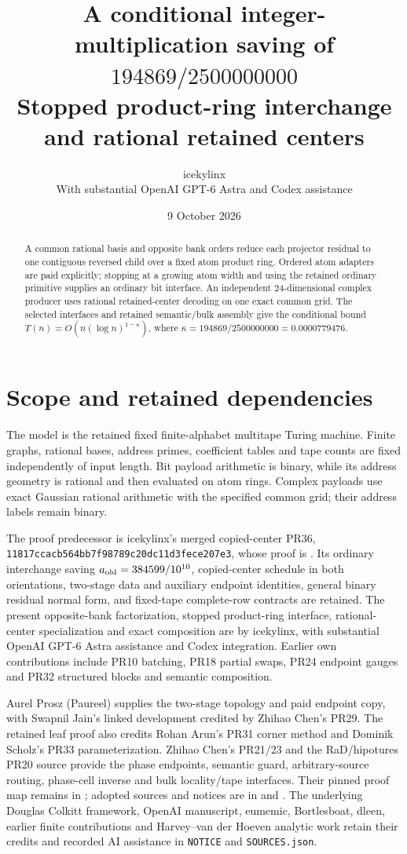 \documentclass[11pt]{article}
\title{A conditional integer-multiplication saving of $194869/2500000000$\\
\large Stopped product-ring interchange and rational retained centers}
\author{icekylinx\\\small With substantial OpenAI GPT-6 Astra and Codex assistance}
\date{9 October 2026}
\begin{document}
\maketitle
\begin{abstract}
A common rational basis and opposite bank orders reduce each projector
residual to one contiguous reversed child over a fixed atom product ring.
Ordered atom adapters are paid explicitly; stopping at a growing atom
width and using the retained ordinary primitive supplies an ordinary
bit interface. An independent 24-dimensional complex producer uses
rational retained-center decoding on one exact common grid. The selected
interfaces and retained semantic/bulk assembly give the conditional bound
$T(n)=O(n(\log n)^{1-\kappa})$, where
$\kappa=194869/2500000000=0.0000779476$.
\end{abstract}

\section{Scope and retained dependencies}
The model is the retained fixed finite-alphabet multitape Turing machine.
Finite graphs, rational bases, address primes, coefficient tables and tape
counts are fixed independently of input length. Bit payload arithmetic is
binary, while its address geometry is rational and then evaluated on atom
rings. Complex payloads use exact Gaussian rational arithmetic with the
specified common grid; their address labels remain binary.

The proof predecessor is icekylinx's merged copied-center PR36,
\texttt{11817ccacb564bb7f98789c20dc11d3fece207e3}, whose proof is
. Its ordinary interchange saving
$a_{\rm old}=384599/10^{10}$, copied-center schedule in both orientations,
two-stage data and auxiliary endpoint identities, general binary residual
normal form, and fixed-tape complete-row contracts are retained.
The present opposite-bank factorization, stopped product-ring interface,
rational-center specialization and exact composition are by icekylinx,
with substantial OpenAI GPT-6 Astra assistance and Codex integration.
Earlier own contributions include PR10 batching, PR18 partial swaps,
PR24 endpoint gauges and PR32 structured blocks and semantic composition.

Aurel Prosz (Paureel) supplies the two-stage topology and paid endpoint
copy, with Swapnil Jain's linked development credited by Zhihao Chen's
PR29. The retained leaf proof also credits Rohan Arun's PR31 corner method
and Dominik Scholz's PR33 parameterization. Zhihao Chen's PR21/23 and the
RaD/hipotures PR20 source provide the phase endpoints, semantic guard,
arbitrary-source routing, phase-cell inverse and bulk locality/tape
interfaces. Their pinned proof map remains in
; adopted sources and notices are
in  and .
The underlying Douglas Colkitt framework, OpenAI manuscript, eumemic,
Bortlesboat, dleen, earlier finite contributions and Harvey--van der Hoeven
analytic work retain their credits and recorded AI assistance in
\texttt{NOTICE} and \texttt{SOURCES.json}.
\end{document}
